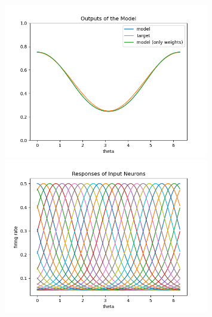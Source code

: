 \documentclass[12pt, a4paper]{article}
\begin{document}
\begin{figure}[H]
    \centering
    \includegraphics[width=0.8\textwidth]{baseline_abb05/fig/0221_abb05_bphebb_output.png} \\
    \includegraphics[width=0.8\textwidth]{baseline_abb05/fig/0221_abb05_bphebb_rf.png}
\end{figure}
\end{document}
